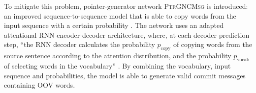 To mitigate this problem, pointer-generator network \textsc{PtrGNCMsg} is introduced: an improved sequence-to-sequence model that is able to copy words from the input sequence with a certain probability \cite{liu_generating_2019}. The network uses an adapted attentional RNN encoder-decoder architecture, where, at each decoder prediction step, ``the RNN decoder calculates the probability $p_\text{copy}$ of copying words from the source sentence according to the attention distribution, and the probability $p_\text{vocab}$ of selecting words in the vocabulary'' \cite{liu_generating_2019}. By combining the vocabulary, input sequence and probabilities, the model is able to generate valid commit messages containing OOV words.
